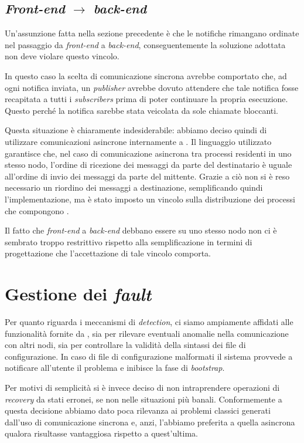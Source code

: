 \subsection*{\textit{Front-end} $\rightarrow$ \textit{back-end}}
Un'assunzione fatta nella sezione precedente è che le notifiche rimangano ordinate nel passaggio da \textit{front-end} a \textit{back-end}, conseguentemente la soluzione adottata non deve violare questo vincolo.

In questo caso la scelta di comunicazione sincrona avrebbe comportato che, ad ogni notifica inviata, un \textit{publisher} avrebbe dovuto attendere che tale notifica fosse recapitata a tutti i \textit{subscribers} prima di poter continuare la propria esecuzione. Questo perché la notifica sarebbe stata veicolata da sole chiamate bloccanti.

Questa situazione è chiaramente indesiderabile: abbiamo deciso quindi di utilizzare comunicazioni asincrone internamente a \evdisp{}. Il linguaggio utilizzato garantisce che, nel caso di comunicazione asincrona tra processi residenti in uno stesso nodo, l'ordine di ricezione dei messaggi da parte del destinatario è uguale all'ordine di invio dei messaggi da parte del mittente. Grazie a ciò non si è reso necessario un riordino dei messaggi a destinazione, semplificando quindi l'implementazione, ma è stato imposto un vincolo sulla distribuzione dei processi che compongono \evdisp{}.

Il fatto che \textit{front-end} a \textit{back-end} debbano essere su uno stesso nodo non ci è sembrato troppo restrittivo rispetto alla semplificazione in termini di progettazione che l'accettazione di tale vincolo comporta.

\section{Gestione dei \textit{fault}}
Per quanto riguarda i meccanismi di \textit{detection}, ci siamo ampiamente affidati alle funzionalità fornite da \Erlang{}, sia per rilevare eventuali anomalie nella comunicazione con altri nodi, sia per controllare la validità della sintassi dei file di configurazione. In caso di file di configurazione malformati il sistema provvede a notificare all'utente il problema e inibisce la fase di \textit{bootstrap}.

Per motivi di semplicità si è invece deciso di non intraprendere operazioni di \textit{recovery} da stati erronei, se non nelle situazioni più banali.
Conformemente a questa decisione abbiamo dato poca rilevanza ai problemi classici generati dall'uso di comunicazione sincrona e, anzi, l'abbiamo preferita a quella asincrona qualora risultasse vantaggiosa rispetto a quest'ultima.

